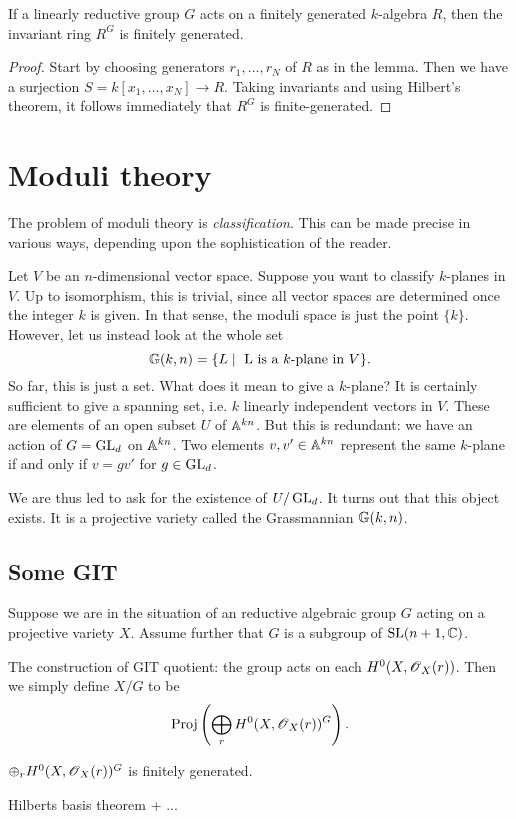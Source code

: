 \documentclass[11pt, english]{article}
\begin{document}
\begin{thm}
If a linearly reductive group $G$ acts on a finitely generated $k$-algebra $R$, then the invariant ring $R^G$ is finitely generated.
\end{thm}
\begin{proof}
Start by choosing generators $r_1,\ldots,r_N$ of $R$ as in the lemma. Then we have a surjection $S=k[x_1,\ldots,x_N] \to R$. Taking invariants and using Hilbert's theorem, it follows immediately that $R^G$ is finite-generated.
\end{proof}

\section{Moduli theory}

The problem of moduli theory is \emph{classification}. This can be made precise in various ways, depending upon the sophistication of the reader.

Let $V$ be an $n$-dimensional vector space. Suppose you want to classify $k$-planes in $V$. Up to isomorphism, this is trivial, since all vector spaces are determined once the integer $k$ is given. In that sense, the moduli space is just the point $\{k \}$. However, let us instead look at the whole set
$$ \mathbb{G}(k,n) = \{ L \mid \text{ L is a $k$-plane in $V$} \}.$$
So far, this is just a set. What does it mean to give a $k$-plane? It is certainly sufficient to give a spanning set, i.e. $k$ linearly independent vectors in $V$. These are elements of an open subset $U$ of $\mathbb{A}^{kn}$. But this is redundant: we have an action of $G=\operatorname{GL}_d$ on $\mathbb{A}^{kn}$. Two elements $v,v' \in \mathbb{A}^{kn}$  represent the same $k$-plane if and only if $v =gv'$ for $g \in \operatorname{GL}_d$.

We are thus led to ask for the existence of $U/\operatorname{GL}_d$. It turns out that this object exists. It is a projective variety called the Grassmannian $\mathbb{G}(k,n)$.

\subsection{Some GIT}

\cite{thomas_git}

Suppose we are in the situation of an reductive algebraic group $G$  acting on a projective variety $X$. Assume further that $G$ is a subgroup of $\operatorname{SL}(n+1,\mathbb{C})$.

The construction of GIT quotient: the group acts on each $H^0(X,\operatorname{\mathscr{O}}_X(r))$. Then we simply define $X/G$ to be 
$$
\operatorname{Proj}\left(\bigoplus_r H^0(X,\operatorname{\mathscr{O}}_X(r))^G\right).
$$
\begin{lemma}
$\oplus_r H^0(X,\operatorname{\mathscr{O}}_X(r))^G$ is finitely generated.
\end{lemma}
\begin{lemma}
  Hilberts basis theorem + ...
\end{lemma}
\end{document}

